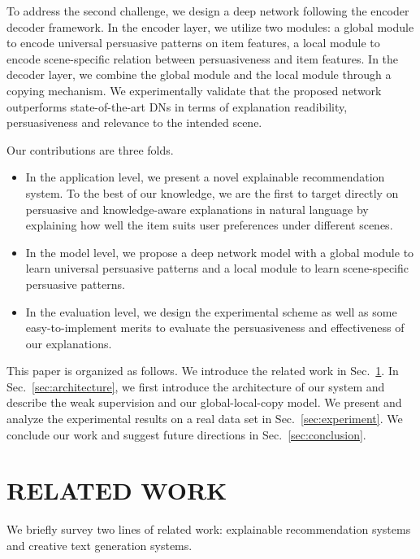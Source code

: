 \documentclass[sigconf]{acmart}
\begin{document}
To address the second challenge, we design a deep network following the encoder decoder framework. In the encoder layer, we utilize two modules: a global module to encode universal persuasive patterns on item features, a local module to encode scene-specific relation between persuasiveness and item features. In the decoder layer, we combine the global module and the local module through a copying mechanism. We experimentally validate that the proposed network outperforms state-of-the-art DNs in terms of explanation readibility, persuasiveness and relevance to the intended scene. 

Our contributions are three folds.
\begin{itemize}
\item In the application level, we present a novel explainable recommendation system. To the best of our knowledge, we are the first to target directly on persuasive and knowledge-aware explanations in natural language by explaining how well the item suits user preferences under different scenes.
\item In the model level, we propose a deep network model with a global module to learn universal persuasive patterns and a local module to learn scene-specific persuasive patterns.
\item In the evaluation level, we design the experimental scheme as well as some easy-to-implement merits to evaluate the persuasiveness and effectiveness of our explanations. 
\end{itemize}


This paper is organized as follows. We introduce the related work in Sec.~\ref{sec:related}. In Sec.~\ref{sec:architecture}, we first introduce the architecture of our system and describe the weak supervision and our global-local-copy model. We present and analyze the experimental results on a real data set in Sec.~\ref{sec:experiment}. We conclude our work and suggest future directions in Sec.~\ref{sec:conclusion}.

\section{RELATED WORK}\label{sec:related}
We briefly survey two lines of related work: explainable recommendation systems and creative text generation systems.
\end{document}
